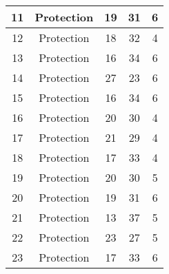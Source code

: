 \documentclass[results.tex]{subfiles}
\begin{document}
\begin{center}
\begin{tabular}{| c || c | c | c | c |}
            \hline
            11                      & Protection                   & 19                     & 31                      & 6                    \\
            \hline
            12                      & Protection                   & 18                     & 32                      & 4                    \\
            \hline
            13                      & Protection                   & 16                     & 34                      & 6                    \\
            \hline
            14                      & Protection                   & 27                     & 23                      & 6                    \\
            \hline
            15                      & Protection                   & 16                     & 34                      & 6                    \\
            \hline
            16                      & Protection                   & 20                     & 30                      & 4                    \\
            \hline
            17                      & Protection                   & 21                     & 29                      & 4                    \\
            \hline
            18                      & Protection                   & 17                     & 33                      & 4                    \\
            \hline
            19                      & Protection                   & 20                     & 30                      & 5                    \\
            \hline
            20                      & Protection                   & 19                     & 31                      & 6                    \\
            \hline
            21                      & Protection                   & 13                     & 37                      & 5                    \\
            \hline
            22                      & Protection                   & 23                     & 27                      & 5                    \\
            \hline
            23                      & Protection                   & 17                     & 33                      & 6                    \\

\end{tabular}
\end{center}
\end{document}
